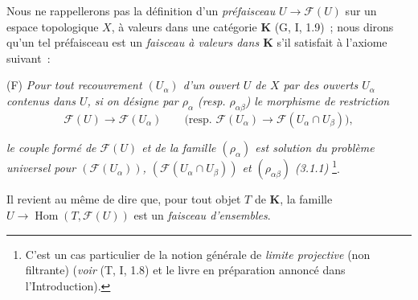 \begin{env}[3.1.2]
\label{0.3.1.2-fr}
Nous ne rappellerons pas la définition d'un \emph{préfaisceau}
$U\to\mathcal{F}(U)$ sur un espace topologique $X$, à valeurs dans une
catégorie $\boldsymbol{K}$ (G, I, 1.9)~; nous dirons qu'un tel préfaisceau est un
\emph{faisceau à valeurs dans $\boldsymbol{K}$} s'il satisfait à l'axiome
suivant~:

\smallskip
\noindent
\textup{(F)} \emph{Pour tout recouvrement $(U_\alpha)$ d'un ouvert $U$ de $X$
par des ouverts $U_\alpha$ contenus dans $U$, si on désigne par $\rho_\alpha$
\textup{(resp. $\rho_{\alpha\beta}$)} le morphisme de restriction}
\[
  \mathcal{F}(U)\to\mathcal{F}(U_\alpha)
  \qquad
  \bigl(\text{resp. }\mathcal{F}(U_\alpha)
  \to\mathcal{F}(U_\alpha\cap U_\beta)\bigr),
\]


\emph{le couple formé de $\mathcal{F}(U)$ et de la famille $(\rho_\alpha)$ est
solution du problème universel pour $(\mathcal{F}(U_\alpha))$,
$(\mathcal{F}(U_\alpha\cap U_\beta))$ et $(\rho_{\alpha\beta})$ \textup{(3.1.1)}}%
\footnote{C'est un cas particulier de la notion générale de \emph{limite
projective} (non filtrante) (\emph{voir} (T, I, 1.8) et le livre en préparation
annoncé dans l'Introduction).}.

Il revient au même de dire que, pour tout objet $T$ de $\boldsymbol{K}$, la
famille $U\to\operatorname{Hom}(T,\mathcal{F}(U))$ est un \emph{faisceau
d'ensembles}.
\end{env}

